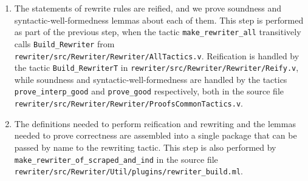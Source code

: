 \documentclass[sigplan,10pt,review,anonymous]{acmart}\settopmatter{printfolios=true,printccs=false,printacmref=false}
\begin{document}
\begin{enumerate}
  \item
    The statements of rewrite rules are reified, and we prove soundness and syntactic-well-formedness lemmas about each of them.
    This step is performed as part of the previous step, when the tactic \texttt{make\_rewriter\_all} transitively calls \texttt{Build\_Rewriter} from \texttt{rewriter/src/Rewriter/Rewriter/AllTactics.v}.
    Reification is handled by the tactic \texttt{Build\_RewriterT} in \texttt{rewriter/src/Rewriter/Rewriter/Reify.v}, while soundness and syntactic-well-formedness are handled by the tactics \texttt{prove\_interp\_good} and \texttt{prove\_good} respectively, both in the source file \texttt{rewriter/src/Rewriter/Rewriter/ProofsCommonTactics.v}.
  \item
    The definitions needed to perform reification and rewriting and the lemmas needed to prove correctness are assembled into a single package that can be passed by name to the rewriting tactic.
    This step is also performed by \texttt{make\_rewriter\_of\_scraped\_and\_ind} in the source file \texttt{rewriter/src/Rewriter/Util/plugins/rewriter\_build.ml}.
\end{enumerate}
\end{document}
